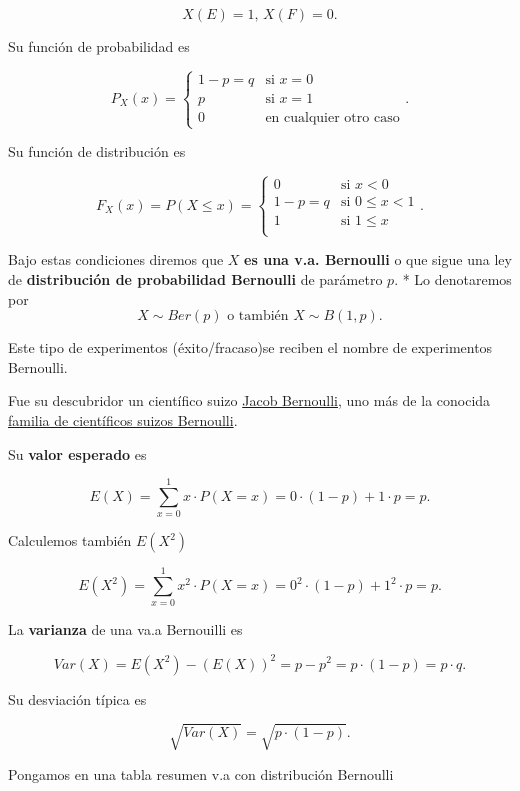 \documentclass[
  letterpaper,
  DIV=11,
  numbers=noendperiod]{scrreprt}
\begin{document}
\[
X(E)=1\mbox{, }X(F)=0.
\]

Su función de probabilidad es

\[
P_{X}(x)=
\left\{
\begin{array}{ll} 1-p=q & \mbox{si } x=0\\
p & \mbox{si } x=1\\
0 & \mbox{en cualquier otro caso}
\end{array}
\right..
\]

Su función de distribución es

\[
F_{X}(x)=P(X\leq x)=
\left\{
\begin{array}{ll} 
0 & \mbox{si } x<0\\
1-p=q & \mbox{si } 0\leq x <1\\
1 & \mbox{si } 1\leq x \\
\end{array}
\right..
\]

Bajo estas condiciones diremos que \(X\) \textbf{es una v.a. Bernoulli}
o que sigue una ley de \textbf{distribución de probabilidad Bernoulli}
de parámetro \(p\). * Lo denotaremos por
\[X\sim Ber(p)\mbox{ o también } X\sim B(1,p).\]

Este tipo de experimentos (éxito/fracaso)se reciben el nombre de
experimentos Bernoulli.

Fue su descubridor un científico suizo
\href{https://es.wikipedia.org/wiki/Jakob_Bernoulli}{Jacob Bernoulli},
uno más de la conocida
\href{https://es.wikipedia.org/wiki/Familia_Bernoulli}{familia de
científicos suizos Bernoulli}.

Su \textbf{valor esperado} es

\[E(X)=\displaystyle\sum_{x=0}^1 x\cdot P(X=x)= 0\cdot(1-p)+1\cdot p=p.\]

Calculemos también \(E(X^2)\)

\[E(X^2)=\displaystyle\sum_{x=0}^1 x^2\cdot P(X=x)= 0^2\cdot(1-p)+1^2\cdot p=p.\]

La \textbf{varianza} de una va.a Bernouilli es

\[Var(X)=E(X^2)-\left(E(X)\right)^2=p-p^2=p\cdot (1-p)=p\cdot q.\]

Su desviación típica es

\[
\sqrt{Var(X)}=\sqrt{p \cdot (1-p)}.
\]

Pongamos en una tabla resumen v.a con distribución Bernoulli
\end{document}
